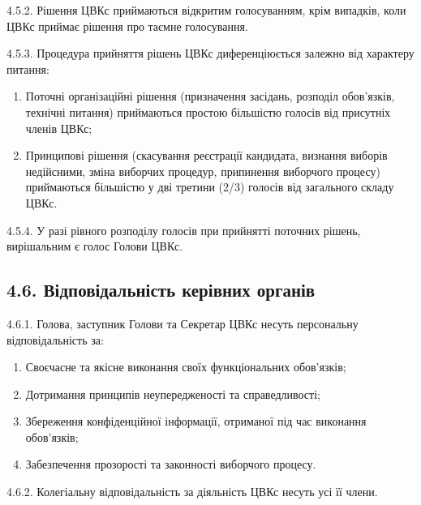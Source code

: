     4.5.2. Рішення ЦВКс приймаються відкритим голосуванням, крім випадків, коли ЦВКс приймає рішення про таємне голосування.

    4.5.3. Процедура прийняття рішень ЦВКс диференціюється залежно від характеру питання:

        \begin{enumerate}[label=\alph*)]
            \item Поточні організаційні рішення (призначення засідань, розподіл обов'язків, технічні питання) приймаються простою більшістю голосів від присутніх членів ЦВКс;
            \item Принципові рішення (скасування реєстрації кандидата, визнання виборів недійсними, зміна виборчих процедур, припинення виборчого процесу) приймаються більшістю у дві третини (2/3) голосів від загального складу ЦВКс.
        \end{enumerate}

    4.5.4. У разі рівного розподілу голосів при прийнятті поточних рішень, вирішальним є голос Голови ЦВКс.

\subsection*{4.6. Відповідальність керівних органів}
    4.6.1. Голова, заступник Голови та Секретар ЦВКс несуть персональну відповідальність за:

        \begin{enumerate}[label=\alph*)]
            \item Своєчасне та якісне виконання своїх функціональних обов'язків;
            \item Дотримання принципів неупередженості та справедливості;
            \item Збереження конфіденційної інформації, отриманої під час виконання обов'язків;
            \item Забезпечення прозорості та законності виборчого процесу.
        \end{enumerate}

    4.6.2. Колегіальну відповідальність за діяльність ЦВКс несуть усі її члени.